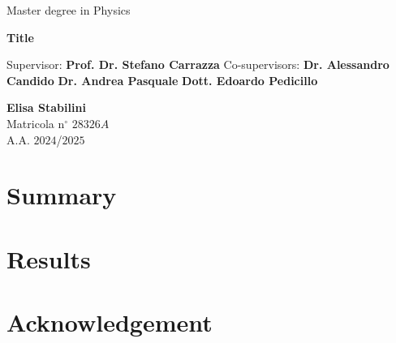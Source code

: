 \documentclass{book}
\theoremstyle{definition}
\begin{document}

\begin{center}
{\Large  Master degree in Physics }
\end{center}


\vskip1.5cm
\begin{center}
{\fontsize{15}{20}\selectfont \textbf{Title\\}}
\end{center}


{\large
\vskip 20mm Supervisor:
\vskip 0.2mm \large  \textbf{Prof. Dr. Stefano Carrazza}
\vskip 5mm
\large Co-supervisors:
\vskip 0.2mm
\large \textbf{Dr. Alessandro Candido}
\vskip 0.2mm
\large \textbf{Dr. Andrea Pasquale}
\vskip 0.2mm
\large \textbf{Dott. Edoardo Pedicillo}
}


\vskip 2cm
\hskip 9cm\parbox[t]{7cm}
{\large 
\textbf{Elisa Stabilini}\\
Matricola n$^\circ$ $28326A$\\
A.A. $2024$/$2025$\\      
}
\clearpage


\clearpage
\tableofcontents
\clearpage

\chapter*{Summary}
\chapter{Results}

%


\chapter*{Acknowledgement}
\end{document}
